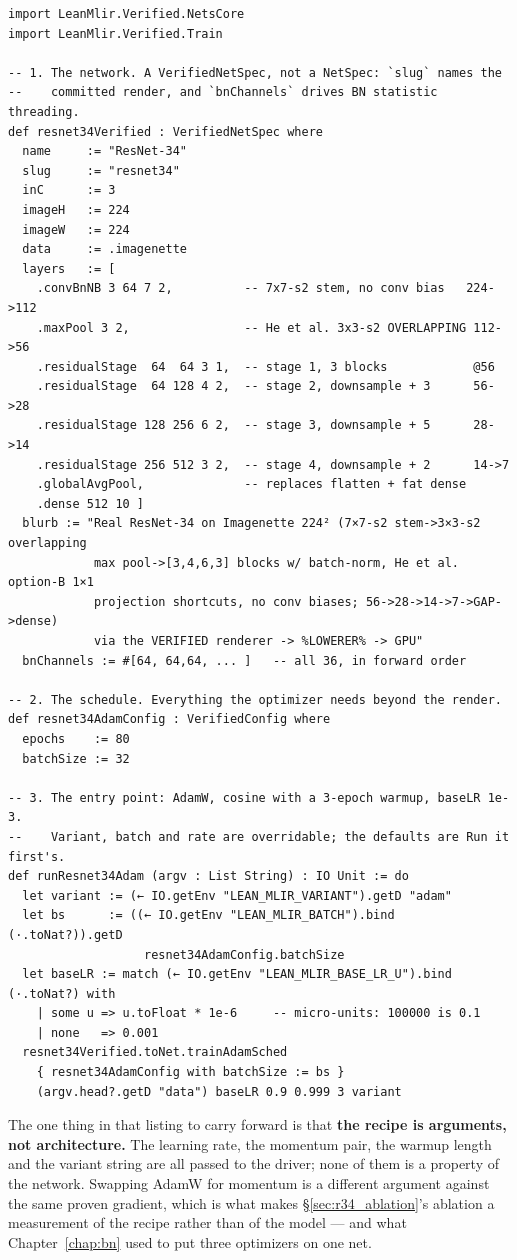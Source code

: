 \begin{verbatim}
import LeanMlir.Verified.NetsCore
import LeanMlir.Verified.Train

-- 1. The network. A VerifiedNetSpec, not a NetSpec: `slug` names the
--    committed render, and `bnChannels` drives BN statistic threading.
def resnet34Verified : VerifiedNetSpec where
  name     := "ResNet-34"
  slug     := "resnet34"
  inC      := 3
  imageH   := 224
  imageW   := 224
  data     := .imagenette
  layers   := [
    .convBnNB 3 64 7 2,          -- 7x7-s2 stem, no conv bias   224->112
    .maxPool 3 2,                -- He et al. 3x3-s2 OVERLAPPING 112->56
    .residualStage  64  64 3 1,  -- stage 1, 3 blocks            @56
    .residualStage  64 128 4 2,  -- stage 2, downsample + 3      56->28
    .residualStage 128 256 6 2,  -- stage 3, downsample + 5      28->14
    .residualStage 256 512 3 2,  -- stage 4, downsample + 2      14->7
    .globalAvgPool,              -- replaces flatten + fat dense
    .dense 512 10 ]
  blurb := "Real ResNet-34 on Imagenette 224² (7×7-s2 stem->3×3-s2 overlapping
            max pool->[3,4,6,3] blocks w/ batch-norm, He et al. option-B 1×1
            projection shortcuts, no conv biases; 56->28->14->7->GAP->dense)
            via the VERIFIED renderer -> %LOWERER% -> GPU"
  bnChannels := #[64, 64,64, ... ]   -- all 36, in forward order

-- 2. The schedule. Everything the optimizer needs beyond the render.
def resnet34AdamConfig : VerifiedConfig where
  epochs    := 80
  batchSize := 32

-- 3. The entry point: AdamW, cosine with a 3-epoch warmup, baseLR 1e-3.
--    Variant, batch and rate are overridable; the defaults are Run it first's.
def runResnet34Adam (argv : List String) : IO Unit := do
  let variant := (← IO.getEnv "LEAN_MLIR_VARIANT").getD "adam"
  let bs      := ((← IO.getEnv "LEAN_MLIR_BATCH").bind (·.toNat?)).getD
                   resnet34AdamConfig.batchSize
  let baseLR := match (← IO.getEnv "LEAN_MLIR_BASE_LR_U").bind (·.toNat?) with
    | some u => u.toFloat * 1e-6     -- micro-units: 100000 is 0.1
    | none   => 0.001
  resnet34Verified.toNet.trainAdamSched
    { resnet34AdamConfig with batchSize := bs }
    (argv.head?.getD "data") baseLR 0.9 0.999 3 variant
\end{verbatim}

\noindent The one thing in that listing to carry forward is that \textbf{the recipe
is arguments, not architecture.} The learning rate, the momentum pair, the warmup
length and the variant string are all passed to the driver; none of them is a
property of the network. Swapping AdamW for momentum is a different argument
against the same proven gradient, which is what makes
\S\ref{sec:r34_ablation}'s ablation a measurement of the recipe rather than of the
model --- and what Chapter~\ref{chap:bn} used to put three optimizers on one net.

